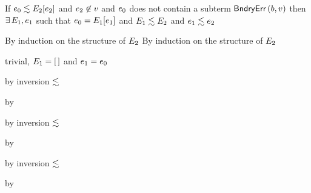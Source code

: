 \begin{lemma}\label{A-context-matching}\leavevmode
  If\/ $e_0 \lesssim E_2[e_2]$
  and\/ $e_2 \not\in v$
  and\/ $e_0$ does not contain a subterm\/ $\mathsf{BndryErr}\,(b, v)$
  then\/ $\exists\,E_1,e_1$
  such that\/ $e_0 = E_1[e_1]$
  and\/ $E_1 \lesssim E_2$
  and\/ $e_1 \lesssim e_2$
\end{lemma}{
  \newcommand{\shortpf}{By induction on the structure of $\ctx_2$}
\begin{lamportproof*}
  \shortpf
\mainproof
  \shortpf

    \begin{pfproof}
      trivial, $E_1 = {[\,]}$ and $e_1 = e_0$
    \end{pfproof}

    \begin{pfproof}
        \begin{pfproof}
          by inversion $\lesssim$
        \end{pfproof}
      \qedstep
        \begin{pfproof}
          by \pfih
        \end{pfproof}
    \end{pfproof}

    \begin{pfproof}
        \begin{pfproof}
          by inversion $\lesssim$
        \end{pfproof}
      \qedstep
        \begin{pfproof}
          by \pfih
        \end{pfproof}
    \end{pfproof}

    \begin{pfproof}
        \begin{pfproof}
          by inversion $\lesssim$
        \end{pfproof}
      \qedstep
        \begin{pfproof}
          by \pfih
        \end{pfproof}
    \end{pfproof}


\end{lamportproof*}}
